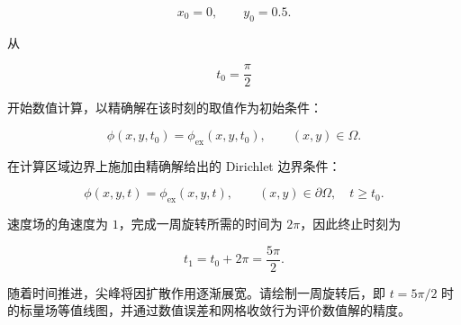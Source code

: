 \documentclass[UTF8,12pt,a4paper,fontset=fandol]{ctexart}
\begin{document}
\begin{equation}
x_0=0,
\qquad
y_0=0.5.
\end{equation}

从

\begin{equation}
t_0=\frac{\pi}{2}
\end{equation}

开始数值计算，以精确解在该时刻的取值作为初始条件：

\begin{equation}
\phi(x,y,t_0)=\phi_{\mathrm{ex}}(x,y,t_0),
\qquad (x,y)\in\Omega.
\end{equation}

在计算区域边界上施加由精确解给出的 Dirichlet 边界条件：

\begin{equation}
\phi(x,y,t)=\phi_{\mathrm{ex}}(x,y,t),
\qquad (x,y)\in\partial\Omega,
\quad t\geq t_0.
\end{equation}

速度场的角速度为 $1$，完成一周旋转所需的时间为 $2\pi$，因此终止时刻为

\begin{equation}
t_1=t_0+2\pi=\frac{5\pi}{2}.
\end{equation}

随着时间推进，尖峰将因扩散作用逐渐展宽。请绘制一周旋转后，即 $t=5\pi/2$ 时的标量场等值线图，并通过数值误差和网格收敛行为评价数值解的精度。
\end{document}
